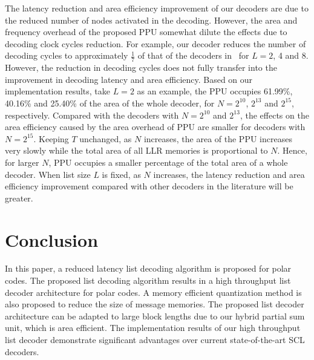 \documentclass[journal]{IEEEtran}
\begin{document}
The latency reduction and area efficiency improvement of our decoders are due to the reduced number of nodes activated in the decoding. However, the area and frequency overhead of the proposed PPU somewhat dilute the effects due to decoding clock cycles reduction. For example, our decoder reduces the number of decoding cycles to approximately $\frac{1}{7}$ of that of the decoders in~\cite{llr_list_tsp} for $L=2$, 4 and 8. However, the reduction in decoding cycles does not fully transfer into the improvement in decoding latency and area efficiency. Based on our implementation results, take $L=2$ as an example, the PPU occupies 61.99\%, 40.16\% and 25.40\% of the area of the whole decoder, for $N=2^{10}$, $2^{13}$ and $2^{15}$, respectively. Compared with the decoders with $N=2^{10}$ and $2^{13}$, the effects on the area efficiency caused by the area overhead of PPU are smaller for decoders with $N=2^{15}$. Keeping $T$ unchanged, as $N$ increases, the area of the PPU increases very slowly while the total area of all LLR memories is proportional to $N$. Hence, for larger $N$, PPU occupies a smaller percentage of the total area of a whole decoder. When list size $L$ is fixed, as $N$ increases, the latency reduction and area efficiency improvement compared with other decoders in the literature will be greater.



\section{Conclusion} \label{sec: conclusion}
In this paper, a reduced latency list decoding algorithm is proposed for polar codes. The proposed list decoding algorithm results in a high throughput list decoder architecture for polar codes. A memory efficient quantization method is also proposed to reduce the size of message memories. The proposed list decoder architecture can be adapted to large block lengths due to our hybrid partial sum unit, which is area efficient. The implementation results of our high throughput list decoder demonstrate significant advantages over current state-of-the-art SCL decoders.



\end{document}
